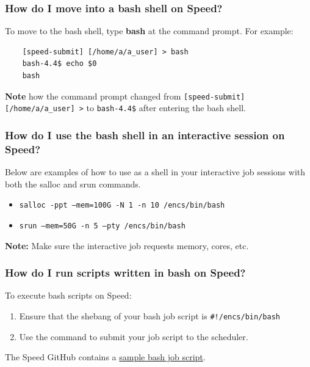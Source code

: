 \subsubsection{How do I move into a bash shell on Speed?}
To move to the bash shell, type \textbf{bash} at the command prompt.
For example:
\begin{verbatim}
	[speed-submit] [/home/a/a_user] > bash
	bash-4.4$ echo $0
	bash
\end{verbatim}	

\textbf{Note} how the command prompt changed from \verb![speed-submit] [/home/a/a_user] >! to \verb!bash-4.4$! 
after entering the bash shell.

\subsubsection{How do I use the bash shell in an interactive session on Speed?}
Below are examples of how to use  as a shell in your interactive job 
sessions with both the salloc and srun commands.

\begin{itemize}
	\item \texttt{salloc -ppt --mem=100G -N 1 -n 10 /encs/bin/bash}
	\item \texttt{srun  --mem=50G -n 5 --pty /encs/bin/bash}
\end{itemize}

\textbf{Note:} Make sure the interactive job requests memory, cores, etc.

\subsubsection{How do I run scripts written in bash on Speed?}
To execute bash scripts on Speed:
\begin{enumerate}
	\item Ensure that the shebang of your bash job script is \verb+#!/encs/bin/bash+
	\item Use the  command to submit your job script to the scheduler.
\end{enumerate}

The Speed GitHub contains a
\href{https://github.com/NAG-DevOps/speed-hpc/blob/master/src/bash.sh}{sample bash job script}.

